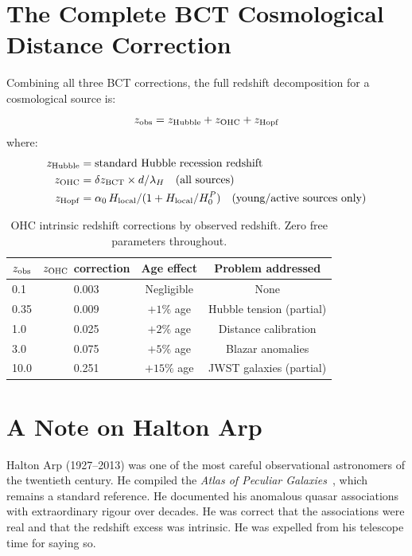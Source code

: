 \documentclass[twocolumn,10pt]{article}
\begin{document}
\section{The Complete BCT Cosmological Distance Correction}

Combining all three BCT corrections, the full redshift
decomposition for a cosmological source is:
%
\begin{equation}
z_{\rm obs} = z_{\rm Hubble} + z_{\rm OHC} + z_{\rm Hopf}
\end{equation}
%
where:
\begin{align}
z_{\rm Hubble} &= \text{standard Hubble recession redshift} \\
z_{\rm OHC} &= \delta z_{\rm BCT} \times d/\lambda_H 
               \quad \text{(all sources)} \\
z_{\rm Hopf} &= \alpha_0\,H_{\rm local}/(1+H_{\rm local}/H_0^P)
               \quad \text{(young/active sources only)}
\end{align}

\begin{table}[h]
\centering
\begin{tabular}{@{}lccc@{}}
\toprule
$z_{\rm obs}$ & $z_{\rm OHC}$ correction & Age effect & Problem addressed \\
\midrule
0.1 & 0.003 & Negligible & None \\
0.35 & 0.009 & $+1\%$ age & Hubble tension (partial) \\
1.0 & 0.025 & $+2\%$ age & Distance calibration \\
3.0 & 0.075 & $+5\%$ age & Blazar anomalies \\
10.0 & 0.251 & $+15\%$ age & JWST galaxies (partial) \\
\bottomrule
\end{tabular}
\caption{OHC intrinsic redshift corrections by observed redshift.
Zero free parameters throughout.}
\end{table}

\section{A Note on Halton Arp}

Halton Arp (1927--2013) was one of the most careful observational
astronomers of the twentieth century. He compiled the \textit{Atlas
of Peculiar Galaxies}~\cite{arp1966}, which remains a standard
reference. He documented his anomalous quasar associations with
extraordinary rigour over decades. He was correct that the
associations were real and that the redshift excess was intrinsic.
He was expelled from his telescope time for saying so.
\end{document}
